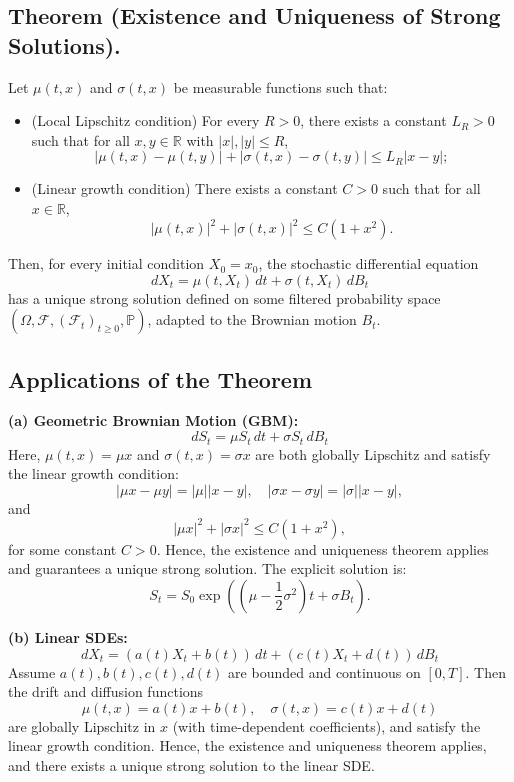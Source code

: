 
\subsection{Theorem (Existence and Uniqueness of Strong Solutions).}  
Let \( \mu(t, x) \) and \( \sigma(t, x) \) be measurable functions such that:
\begin{itemize}
    \item (Local Lipschitz condition) For every \( R > 0 \), there exists a constant \( L_R > 0 \) such that for all \( x, y \in \mathbb{R} \) with \( |x|, |y| \leq R \),
    \[
    |\mu(t,x) - \mu(t,y)| + |\sigma(t,x) - \sigma(t,y)| \leq L_R |x - y|;
    \]
    \item (Linear growth condition) There exists a constant \( C > 0 \) such that for all \( x \in \mathbb{R} \),
    \[
    |\mu(t,x)|^2 + |\sigma(t,x)|^2 \leq C(1 + x^2).
    \]
\end{itemize}
Then, for every initial condition \( X_0 = x_0 \), the stochastic differential equation
\[
dX_t = \mu(t, X_t) \, dt + \sigma(t, X_t) \, dB_t
\]
has a unique strong solution defined on some filtered probability space \( (\Omega, \mathcal{F}, (\mathcal{F}_t)_{t \geq 0}, \mathbb{P}) \), adapted to the Brownian motion \( B_t \).

\vspace{0.5em}
\subsection{Applications of the Theorem}

\textbf{(a) Geometric Brownian Motion (GBM):}
\[
dS_t = \mu S_t \, dt + \sigma S_t \, dB_t
\]
Here, \( \mu(t,x) = \mu x \) and \( \sigma(t,x) = \sigma x \) are both globally Lipschitz and satisfy the linear growth condition:
\[
|\mu x - \mu y| = |\mu||x - y|, \quad |\sigma x - \sigma y| = |\sigma||x - y|,
\]
and
\[
|\mu x|^2 + |\sigma x|^2 \leq C(1 + x^2),
\]
for some constant \( C > 0 \). Hence, the existence and uniqueness theorem applies and guarantees a unique strong solution. The explicit solution is:
\[
S_t = S_0 \exp\left( \left( \mu - \frac{1}{2} \sigma^2 \right)t + \sigma B_t \right).
\]

\textbf{(b) Linear SDEs:}
\[
dX_t = (a(t) X_t + b(t)) \, dt + (c(t) X_t + d(t)) \, dB_t
\]
Assume \( a(t), b(t), c(t), d(t) \) are bounded and continuous on \( [0,T] \). Then the drift and diffusion functions
\[
\mu(t,x) = a(t)x + b(t), \quad \sigma(t,x) = c(t)x + d(t)
\]
are globally Lipschitz in \( x \) (with time-dependent coefficients), and satisfy the linear growth condition. Hence, the existence and uniqueness theorem applies, and there exists a unique strong solution to the linear SDE.